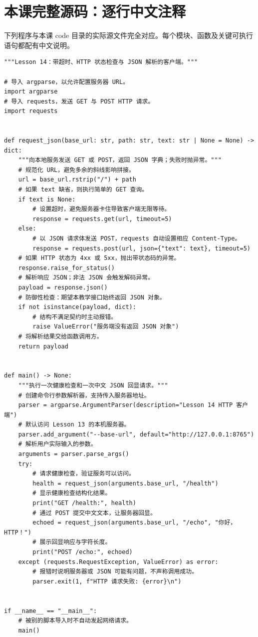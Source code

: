 \documentclass[UTF8,11pt,a4paper]{ctexart}
\begin{document}
\section{本课完整源码：逐行中文注释}
下列程序与本课 code 目录的实际源文件完全对应。每个模块、函数及关键可执行语句都配有中文说明。
\begin{Verbatim}[fontsize=\scriptsize,breaklines=true,breakanywhere=true]
"""Lesson 14：带超时、HTTP 状态检查与 JSON 解析的客户端。"""

# 导入 argparse，以允许配置服务器 URL。
import argparse
# 导入 requests，发送 GET 与 POST HTTP 请求。
import requests


def request_json(base_url: str, path: str, text: str | None = None) -> dict:
    """向本地服务发送 GET 或 POST，返回 JSON 字典；失败时抛异常。"""
    # 规范化 URL，避免多余的斜线影响拼接。
    url = base_url.rstrip("/") + path
    # 如果 text 缺省，则执行简单的 GET 查询。
    if text is None:
        # 设置超时，避免服务器卡住导致客户端无限等待。
        response = requests.get(url, timeout=5)
    else:
        # 以 JSON 请求体发送 POST，requests 自动设置相应 Content-Type。
        response = requests.post(url, json={"text": text}, timeout=5)
    # 如果 HTTP 状态为 4xx 或 5xx，抛出带状态码的异常。
    response.raise_for_status()
    # 解析响应 JSON；非法 JSON 会触发解码异常。
    payload = response.json()
    # 防御性检查：期望本教学接口始终返回 JSON 对象。
    if not isinstance(payload, dict):
        # 结构不满足契约时主动报错。
        raise ValueError("服务端没有返回 JSON 对象")
    # 将解析结果交给函数调用方。
    return payload


def main() -> None:
    """执行一次健康检查和一次中文 JSON 回显请求。"""
    # 创建命令行参数解析器，支持传入服务器地址。
    parser = argparse.ArgumentParser(description="Lesson 14 HTTP 客户端")
    # 默认访问 Lesson 13 的本机服务器。
    parser.add_argument("--base-url", default="http://127.0.0.1:8765")
    # 解析用户实际输入的参数。
    arguments = parser.parse_args()
    try:
        # 请求健康检查，验证服务可以访问。
        health = request_json(arguments.base_url, "/health")
        # 显示健康检查结构化结果。
        print("GET /health:", health)
        # 通过 POST 提交中文文本，让服务器回显。
        echoed = request_json(arguments.base_url, "/echo", "你好，HTTP！")
        # 展示回显响应与字符长度。
        print("POST /echo:", echoed)
    except (requests.RequestException, ValueError) as error:
        # 报错时说明服务器或 JSON 可能有问题，不声称调用成功。
        parser.exit(1, f"HTTP 请求失败: {error}\n")


if __name__ == "__main__":
    # 被别的脚本导入时不自动发起网络请求。
    main()
\end{Verbatim}
\end{document}
